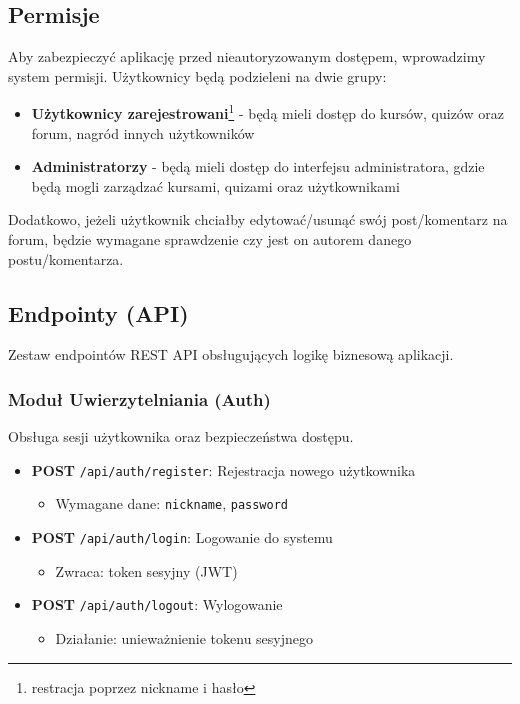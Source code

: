 \documentclass[11pt,a4paper]{article}
\numberwithin{equation}{section}
\begin{document}
\subsection{Permisje}
Aby zabezpieczyć aplikację przed nieautoryzowanym dostępem, wprowadzimy system permisji. Użytkownicy będą podzieleni na dwie grupy:
\begin{itemize}
    \item \textbf{Użytkownicy zarejestrowani}\footnote{restracja poprzez nickname i hasło} - będą mieli dostęp do kursów, quizów oraz forum, nagród innych użytkowników
    \item \textbf{Administratorzy} - będą mieli dostęp do interfejsu administratora, gdzie będą mogli zarządzać kursami, quizami oraz użytkownikami
\end{itemize}
Dodatkowo, jeżeli użytkownik chciałby edytować/usunąć swój post/komentarz na forum, będzie wymagane sprawdzenie czy jest on autorem danego postu/komentarza.

\subsection{Endpointy (API)}

Zestaw endpointów REST API obsługujących logikę biznesową aplikacji.

\subsubsection{Moduł Uwierzytelniania (Auth)}
Obsługa sesji użytkownika oraz bezpieczeństwa dostępu.
\begin{itemize}
    \item \textbf{POST} \texttt{/api/auth/register}: Rejestracja nowego użytkownika
        \begin{itemize}
            \item Wymagane dane: \texttt{nickname}, \texttt{password}
        \end{itemize}
    \item \textbf{POST} \texttt{/api/auth/login}: Logowanie do systemu
        \begin{itemize}
            \item Zwraca: token sesyjny (JWT)
        \end{itemize}
    \item \textbf{POST} \texttt{/api/auth/logout}: Wylogowanie
        \begin{itemize}
            \item Działanie: unieważnienie tokenu sesyjnego
        \end{itemize}
\end{itemize}
\end{document}
